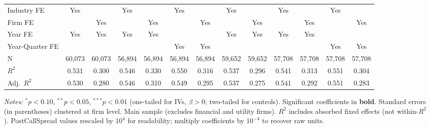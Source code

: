 \begin{landscape}
\begin{table}[H]
\begin{tabular}{lcccccccccccc}
Industry FE & Yes &  & Yes &  & Yes &  & Yes &  & Yes &  & Yes &  \\
Firm FE &  & Yes &  & Yes &  & Yes &  & Yes &  & Yes &  & Yes \\
Year FE & Yes & Yes & Yes & Yes &  &  & Yes & Yes & Yes & Yes &  &  \\
Year-Quarter FE &  &  &  &  & Yes & Yes &  &  &  &  & Yes & Yes \\
\midrule
N & 60,073 & 60,073 & 56,894 & 56,894 & 56,894 & 56,894 & 59,652 & 59,652 & 57,708 & 57,708 & 57,708 & 57,708 \\
$R^2$ & 0.531 & 0.300 & 0.546 & 0.330 & 0.550 & 0.316 & 0.537 & 0.296 & 0.541 & 0.313 & 0.551 & 0.304 \\
Adj.~$R^2$ & 0.530 & 0.280 & 0.546 & 0.310 & 0.549 & 0.295 & 0.537 & 0.275 & 0.541 & 0.292 & 0.551 & 0.283 \\
\bottomrule
\end{tabular}
\begin{minipage}{\linewidth}
\vspace{2pt}\scriptsize
\textit{Notes:} $^{*}p<0.10$, $^{**}p<0.05$, $^{***}p<0.01$ (one-tailed for IVs, $\beta > 0$; two-tailed for controls).
 Significant coefficients in \textbf{bold}.
 Standard errors (in parentheses) clustered at firm level.
 Main sample (excludes financial and utility firms).
 $R^2$ includes absorbed fixed effects (not within-$R^2$).
 PostCallSpread values rescaled by $10^4$ for readability; multiply coefficients by $10^{-4}$ to recover raw units.
\end{minipage}
\end{table}
\end{landscape}